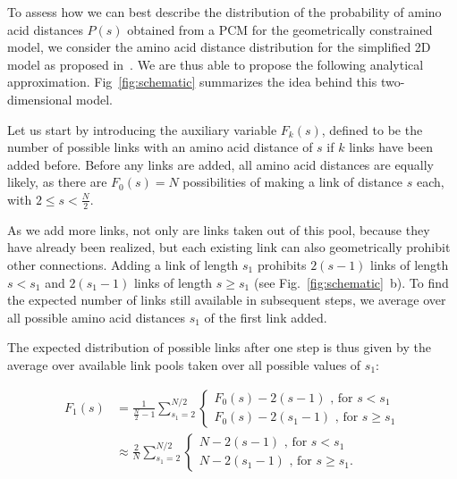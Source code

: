 \documentclass[
reprint,
twocolumn,
amsmath,amssymb,superscriptaddress,aps,
pre]{revtex4-1}
\begin{document}
To assess how we can best describe the distribution of the probability of amino acid distances $P(s)$ obtained from a PCM for the geometrically constrained model, we consider the amino acid distance distribution for the simplified 2D model as proposed in~\cite{molkenthin2016scaling}. We are thus able to propose the following analytical approximation. Fig~\ref{fig:schematic} summarizes the idea behind this two-dimensional model.

Let us start by introducing the auxiliary variable $F_k(s)$, defined to be the number of possible links with an amino acid distance of $s$ if $k$ links have been added before. Before any links are added, all amino acid distances are equally likely, as there are $F_0(s)=N$ possibilities of making a link of distance $s$ each, with $2\leq s < \frac{N}{2}$.

As we add more links, not only are links taken out of this pool, because they have already been realized, but each existing link can also geometrically prohibit other connections. Adding a link of length $s_1$ prohibits $2(s-1)$ links of length $s<s_1$ and $2(s_1-1)$ links of length $s\geq s_1$ (see Fig.~\ref{fig:schematic}~b). To find the expected number of links still available in subsequent steps, we average over all possible amino acid distances $s_1$ of the first link added.

The expected distribution of possible links after one step is thus given by the average over available link pools taken over all possible values of $s_1$:


\begin{align}
    F_1(s)&=\frac{1}{\frac{N}{2}-1} \sum_{s_1=2}^{N/2}{ \begin{cases}
    F_0(s)-2(s-1) \text{ , for } s<s_1\\
    F_0(s)-2(s_1 -1)\text{ , for } s\geq s_1
    \end{cases}}\nonumber\\
    &\approx\frac{2}{N} \sum_{s_1=2}^{N/2} { \begin{cases}
    N-2(s-1) \text{ , for } s<s_1\\
    N-2(s_1 -1)\text{ , for } s\geq s_1.
    \end{cases}}
\label{eq:reduction_first_step}
\end{align}
\end{document}
